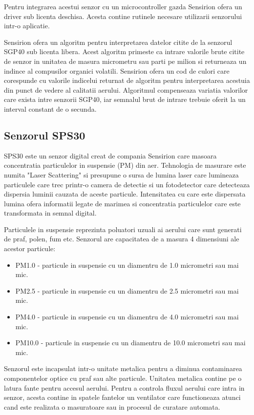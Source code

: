 Pentru integrarea acestui senzor cu un microcontroller gazda Sensirion ofera un driver sub licenta deschisa. Acesta contine rutinele necesare utilizarii senzorului 
intr-o aplicatie.

Sensirion ofera un algoritm pentru interpretarea datelor citite de la senzorul SGP40 sub licenta libera. Acest algoritm primeste ca intrare valorile brute citite de 
senzor in unitatea de masura micrometru sau parti pe milion si returneaza un indince al compusilor organici volatili. Sensirion ofera un cod de culori care corespunde 
cu valorile indicelui returnat de algoritm pentru interpretarea acestuia din punct de vedere al calitatii aerului. Algoritmul compenseaza variatia valorilor care exista 
intre senzorii SGP40, iar semnalul brut de intrare trebuie oferit la un interval constant de o secunda.

\subsection{Senzorul SPS30}\label{subsec:af_sps30}
SPS30 este un senzor digital creat de compania Sensirion care masoara concentratia particulelor in suspensie (PM) din aer. Tehnologia de masurare este numita 
"Laser Scattering" si presupune o sursa de lumina laser care lumineaza particulele care trec printr-o camera de detectie si un fotodetector care detecteaza 
dispersia luminii cauzata de aceste particule. Intensitatea cu care este dispersata lumina ofera informatii legate de marimea si concentratia particulelor care 
este transformata in semnal digital.

Particulele in suspensie reprezinta poluatori uzuali ai aerului care sunt generati de praf, polen, fum etc. Senzorul are capacitatea de a masura 4 dimensiuni ale 
acestor particule:
\begin{itemize}
	\item PM1.0 - particule in suspensie cu un diamentru de 1.0 micrometri sau mai mic.
	\item PM2.5 - particule in suspensie cu un diamentru de 2.5 micrometri sau mai mic.
	\item PM4.0 - particule in suspensie cu un diamentru de 4.0 micrometri sau mai mic.
	\item PM10.0 - particule in suspensie cu un diamentru de 10.0 micrometri sau mai mic.
\end{itemize}

Senzorul este incapsulat intr-o unitate metalica pentru a diminua contaminarea componentelor optice cu praf sau alte particule. Unitatea metalica contine pe o latura 
fante pentru accesul aerului. Pentru a controla fluxul aerului care intra in senzor, acesta contine in spatele fantelor un ventilator care functioneaza atunci cand este 
realizata o masuratoare sau in procesul de curatare automata.

